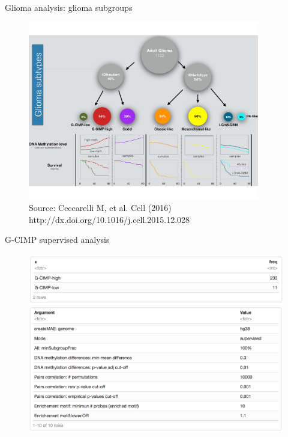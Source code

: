 \documentclass[slidestop,compress,11pt,xcolor=dvipsnames]{beamer}
\begin{document}
\begin{frame}{Glioma analysis: glioma subgroups}
\vspace{-0.5cm}
 \begin{figure}[ht!]
  \centering
  \includegraphics[width=0.9\textwidth]{glioma/figure1.pdf}{\tiny{\\Source: Ceccarelli M, et al. Cell (2016)  http://dx.doi.org/10.1016/j.cell.2015.12.028}}
 \end{figure}
\end{frame}

\begin{frame}{G-CIMP supervised analysis}

 \begin{figure}[ht!]
  \centering
  \includegraphics[width=1.0\textwidth]{glioma/groups.png}
  \includegraphics[width=1.0\textwidth]{glioma/arguments.png}
 \end{figure}
\end{frame}
\end{document}
